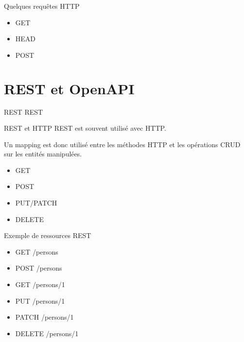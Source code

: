 \documentclass{beamer}
\begin{document}
\begin{frame}{Quelques requêtes HTTP}
\begin{itemize}
  \item GET
  \item HEAD
  \item POST
\end{itemize}
\end{frame}

\section{REST et OpenAPI}
\begin{frame}{REST}
REST
\begin{itemize}
\end{itemize}
\end{frame}

\begin{frame}{REST et HTTP}
REST est souvent utilisé avec HTTP.

Un mapping est donc utilisé entre les méthodes HTTP et les opérations CRUD sur les entités manipulées.
\begin{itemize}
  \item GET
  \item POST
  \item PUT/PATCH
  \item DELETE
\end{itemize}
\end{frame}

\begin{frame}{Exemple de ressources REST}
\begin{itemize}
  \item GET /persons
  \item POST /persons
  \item GET /persons/1
  \item PUT /persons/1
  \item PATCH /persons/1
  \item DELETE /persons/1
\end{itemize}
\end{frame}
\end{document}
